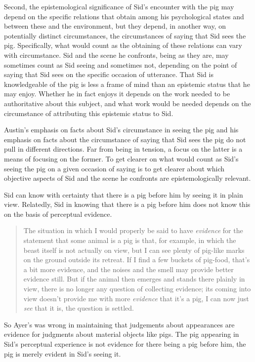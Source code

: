 \documentclass[11pt]{article}
\begin{document}
Second, the epistemological significance of Sid's encounter with the pig may depend on the specific relations that obtain among his psychological states and between these and the environment, but they depend, in another way, on potentially distinct circumstances, the circumstances of saying that Sid sees the pig. Specifically, what would count as the obtaining of these relations can vary with circumstance. Sid and the scene he confronts, being as they are, may sometimes count as Sid seeing and sometimes not, depending on the point of saying that Sid sees on the specific occasion of utterance. That Sid is knowledgeable of the pig is less a frame of mind than an epistemic status that he may enjoy. Whether he in fact enjoys it depends on the work needed to be authoritative about this subject, and what work would be needed depends on the circumstance of attributing this epistemic status to Sid.

Austin's emphasis on facts about Sid's circumstance in seeing the pig and his emphasis on facts about the circumstance of saying that Sid sees the pig do not pull in different directions. Far from being in tension, a focus on the latter is a means of focusing on the former. To get clearer on what would count as Sid's seeing the pig on a given occasion of saying is to get clearer about which objective aspects of Sid and the scene he confronts are epistemologically relevant.

Sid can know with certainty that there is a pig before him by seeing it in plain view. Relatedly, Sid in knowing that there is a pig before him does not know this on the basis of perceptual evidence.
\begin{quote}
    The situation in which I would properly be said to have \emph{evidence} for the statement that some animal is a pig is that, for example, in which the beast itself is not actually on view, but I can see plenty of pig-like marks on the ground outside its retreat. If I find a few buckets of pig-food, that’s a bit more evidence, and the noises and the smell may provide better evidence still. But if the animal then emerges and stands there plainly in view, there is no longer any question of collecting evidence; its coming into view doesn’t provide me with more \emph{evidence} that it’s a pig, I can now just \emph{see} that it is, the question is settled. \citep[115]{Austin:1962lr}
\end{quote}
So Ayer's was wrong in maintaining that judgements about appearances are evidence for judgments about material objects like pigs. The pig appearing in Sid's perceptual experience is not evidence for there being a pig before him, the pig is merely evident in Sid's seeing it. 
\end{document}
